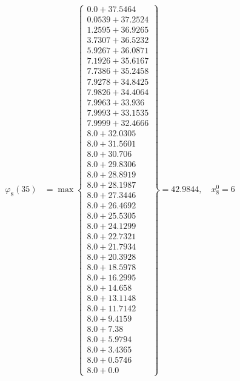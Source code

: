 \documentclass{article}
\begin{document}
\begin{align*}
  
\varphi_{8}(35) &= \max \left\{ \begin{array}{c}
0.0 + 37.5464 \\
 0.0539 + 37.2524 \\
 1.2595 + 36.9265 \\
 3.7307 + 36.5232 \\
 5.9267 + 36.0871 \\
 7.1926 + 35.6167 \\
 7.7386 + 35.2458 \\
 7.9278 + 34.8425 \\
 7.9826 + 34.4064 \\
 7.9963 + 33.936 \\
 7.9993 + 33.1535 \\
 7.9999 + 32.4666 \\
 8.0 + 32.0305 \\
 8.0 + 31.5601 \\
 8.0 + 30.706 \\
 8.0 + 29.8306 \\
 8.0 + 28.8919 \\
 8.0 + 28.1987 \\
 8.0 + 27.3446 \\
 8.0 + 26.4692 \\
 8.0 + 25.5305 \\
 8.0 + 24.1299 \\
 8.0 + 22.7321 \\
 8.0 + 21.7934 \\
 8.0 + 20.3928 \\
 8.0 + 18.5978 \\
 8.0 + 16.2995 \\
 8.0 + 14.658 \\
 8.0 + 13.1148 \\
 8.0 + 11.7142 \\
 8.0 + 9.4159 \\
 8.0 + 7.38 \\
 8.0 + 5.9794 \\
 8.0 + 3.4365 \\
 8.0 + 0.5746 \\
 8.0 + 0.0
\end{array} \right\}=42.9844,\quad x_{8}^0=6\\
  
  
  

\end{align*}
\end{document}
